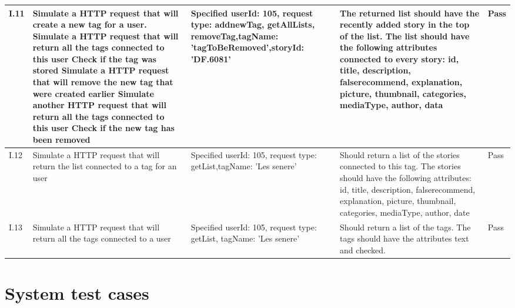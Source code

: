 \begin{appendices}
\begin{center}
\begin{longtable}{ | p{1cm} | p{5.5cm} | p{4cm} | p{4.5cm} | p{2cm}|}
		I.11 & Simulate a HTTP request that will create a new tag for a user. \newline  Simulate a HTTP request that will return all the tags connected to this user \newline Check if the tag was stored \newline Simulate a HTTP request that will remove the new tag that were created earlier \newline Simulate another HTTP request that will return all the tags connected to this user \newline Check if the new tag has been removed  & Specified userId: 105, \newline request type: addnewTag, getAllLists, removeTag,\newline tagName: 'tagToBeRemoved',\newline storyId: 'DF.6081' & The returned list should have the recently added story in the top of the list. The list should have the following attributes connected to every story: id, title, description, false\textunderscore recommend, explanation, picture, thumbnail, categories, mediaType, author, data  & Pass\\ \hline
		
		
		I.12 & Simulate a HTTP request that will return the list connected to a tag for an user  & Specified userId: 105, request type: getList,\newline tagName: 'Les senere' & Should return a list of the stories connected to this tag. The stories should have the following attributes: id, title, description, false\textunderscore recommend, explanation, picture, thumbnail, categories, mediaType, author, date & Pass\\ \hline					
		
		
		I.13 & Simulate a HTTP request that will return all the tags connected to a user  & Specified userId: 105, \newline request type: getList, \newline tagName: 'Les senere' & Should return a list of the tags. The tags should have the attributes text and checked. & Pass\\ \hline	
		
	\end{longtable}
\end{center}
\raggedbottom
\newpage		

\section{System test cases}
\label{app:systemtest}


\end{appendices}
